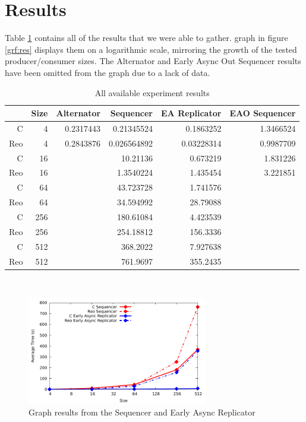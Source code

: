 \section{Results}
Table \ref{tab:res} contains all of the results that we were able to gather. graph in figure \ref{grf:res} displays them on a logarithmic scale, mirroring the growth of the tested producer/consumer sizes. The Alternator and Early Async Out Sequencer results have been omitted from the graph due to a lack of data.
\begin{table}[h]
\begin{center}
    \begin{tabular}{rr|rrrr}
     & \textbf{Size} & \textbf{Alternator} & \textbf{Sequencer} & \textbf{EA Replicator} & \textbf{EAO Sequencer} \\ \hline
    C & 4       & 0.2317443     & 0.21345524    & 0.1863252     & 1.3466524     \\
    Reo & 4     & 0.2843876     & 0.026564892   & 0.03228314    & 0.9987709     \\ \hline
    C & 16      &               & 10.21136      & 0.673219      & 1.831226      \\
    Reo & 16    &               & 1.3540224     & 1.435454      & 3.221851      \\ \hline
    C & 64      &               & 43.723728     & 1.741576      &               \\
    Reo & 64    &               & 34.594992     & 28.79088      &               \\ \hline
    C & 256     &               & 180.61084     & 4.423539      &               \\
    Reo & 256   &               & 254.18812     & 156.3336      &               \\ \hline
    C & 512     &               & 368.2022      & 7.927638      &               \\
    Reo & 512   &               & 761.9697      & 355.2435      &
    \end{tabular}\\
    \caption{All available experiment results}
    \label{tab:res}
\end{center}
\end{table}

\begin{figure}[h]
    \begin{center}
    \includegraphics[width=0.7\textwidth]{img/out-seq.pdf}
    \caption{Graph results from the Sequencer and Early Async Replicator}
    \label{grf:res2}
    \end{center}
\end{figure}
